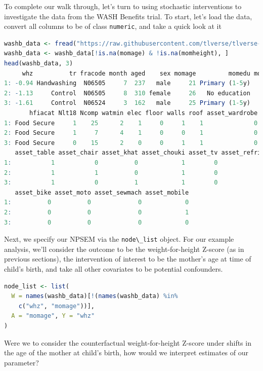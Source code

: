 \documentclass[
  12pt, krantz2,
]{book}
\newcommand{\passthrough}[1]{#1}
\theoremstyle{definition}
\theoremstyle{definition}
\theoremstyle{definition}
\newcommand{\1}{\mathbbm{1}}
\begin{document}
To complete our walk through, let's turn to using stochastic interventions to
investigate the data from the WASH Benefits trial. To start, let's load the
data, convert all columns to be of class \passthrough{\lstinline!numeric!}, and take a quick look at it

\begin{lstlisting}[language=R]
washb_data <- fread("https://raw.githubusercontent.com/tlverse/tlverse-data/master/wash-benefits/washb_data_subset.csv", stringsAsFactors = TRUE)
washb_data <- washb_data[!is.na(momage) & !is.na(momheight), ]
head(washb_data, 3)
     whz          tr fracode month aged    sex momage         momedu momheight
1: -0.94 Handwashing  N06505     7  237   male     21 Primary (1-5y)    146.00
2: -1.13     Control  N06505     8  310 female     26   No education    148.90
3: -1.61     Control  N06524     3  162   male     25 Primary (1-5y)    153.75
       hfiacat Nlt18 Ncomp watmin elec floor walls roof asset_wardrobe
1: Food Secure     1    25      2    1     0     1    1              0
2: Food Secure     1     7      4    1     0     0    1              0
3: Food Secure     0    15      2    0     0     1    1              0
   asset_table asset_chair asset_khat asset_chouki asset_tv asset_refrig
1:           1           0          0            1        0            0
2:           1           1          0            1        0            0
3:           1           0          1            1        0            0
   asset_bike asset_moto asset_sewmach asset_mobile
1:          0          0             0            0
2:          0          0             0            1
3:          0          0             0            0
\end{lstlisting}

Next, we specify our NPSEM via the \passthrough{\lstinline!node\_list!} object. For our example analysis,
we'll consider the outcome to be the weight-for-height Z-score (as in previous
sections), the intervention of interest to be the mother's age at time of
child's birth, and take all other covariates to be potential confounders.

\begin{lstlisting}[language=R]
node_list <- list(
  W = names(washb_data)[!(names(washb_data) %in%
    c("whz", "momage"))],
  A = "momage", Y = "whz"
)
\end{lstlisting}

Were we to consider the counterfactual weight-for-height Z-score under shifts in
the age of the mother at child's birth, how would we interpret estimates of our
parameter?
\end{document}
